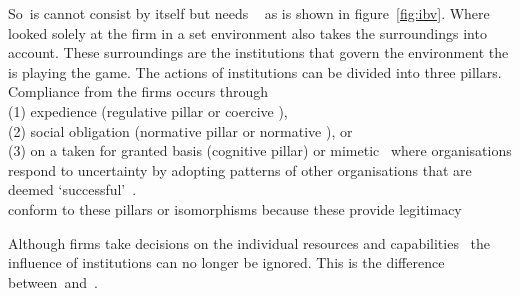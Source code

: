 So~\ibv is cannot consist by itself but needs \rbv~\cite{Barney:1991, Porter:1980} as is shown in figure~\ref{fig:ibv}. 
Where \rbv looked solely at the firm in a set environment \ibv also takes the surroundings into account. These surroundings are the institutions that govern the environment the \mne is playing the game. 
The actions of institutions can be divided into three pillars. Compliance from the firms occurs through \\(1) expedience (regulative pillar or coercive \iso),\\
 (2) social obligation (normative pillar or normative \iso), or \\
 (3) on a taken for granted basis (cognitive pillar) or mimetic \iso~where organisations respond to uncertainty by adopting patterns of other organisations that are deemed `successful'~\cite{Westney:2005,Peng:2008,Kostova:1999,DiMaggio:1983,Scott:1995}.\\ 
\mne conform to these pillars or isomorphisms because these provide legitimacy~\cite{Powell:1991}

Although firms take decisions on the individual resources and capabilities~\cite{Barney:1991} the influence of institutions can no longer be ignored. This is the difference between~\rbv and~\ibv. 

